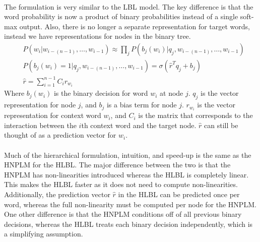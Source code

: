 \paragraph{}
The formulation is very similar to the LBL model. The key difference is that the word probability is now a product of binary probabilities instead of a single soft-max output. Also, there is no longer a separate representation for target words, instead we have representations for nodes in the binary tree.
\begin{align}
&P(w_i | w_{i-(n-1)},\dots, w_{i-1})  \approx \prod_j P(b_j(w_i) | q_j, w_{i-(n-1)},\dots, w_{i-1}) \label{eq:HLBL}
\\ 
&P(b_j(w_i) = 1 | q_j, w_{i-(n-1)},\dots, w_{i-1}) =  \sigma( \hat{r}^T q_{j} +b_{j})
\\ 
&\hat{r} = \sum_{i=1}^{n-1} C_i r_{w_i} \nonumber
\end{align}
Where $b_j(w_i)$ is the binary decision for word $w_i$ at node $j$. $q_j$ is the vector representation for node $j$, and $b_{j}$ is a bias term for node $j$. $r_{w_i}$ is the vector representation for context word $w_i$, and $C_i$ is the matrix that corresponds to the interaction between the $i$th context word and the target node.  $\hat{r}$ can still be thought of as a prediction vector for $w_i$. 

\paragraph{}
Much of the hierarchical formulation, intuition, and speed-up is the same as the HNPLM for the HLBL. The major difference between the two is that the HNPLM has non-linearities introduced whereas the HLBL is completely linear. This makes the HLBL faster as it does not need to compute non-linearities. Additionally, the prediction vector $\hat{r}$ in the HLBL can be predicted once per word, whereas the full non-linearity must be computed per node for the HNPLM. One other difference is that the HNPLM conditions off of all previous binary decisions, whereas the HLBL treats each binary decision independently, which is a simplifying assumption.
